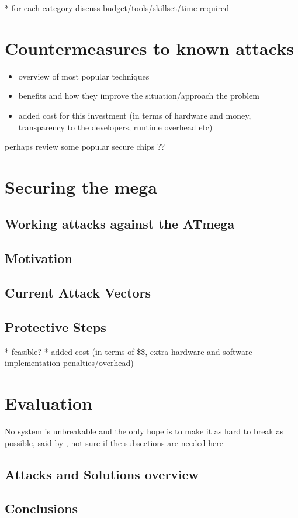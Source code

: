 \documentclass[10pt,a4paper,twocolumn]{article}
\begin{document}
	* for each category discuss budget/tools/skillset/time required\\

\section{Countermeasures to known attacks}
\label{sec:defenses}
	\begin{itemize}
	\item overview of most popular techniques \\
	\item benefits and how they improve the situation/approach the problem
	\item added cost for this investment (in terms of hardware and money, transparency to the developers, runtime overhead etc)\\
	\end{itemize}
	
	perhaps review some popular secure chips ??	
	
	

\section{Securing the mega}
\label{sec:securing_mega}
	\subsection{Working attacks against the ATmega}
	\subsection{Motivation}
	\subsection{Current Attack Vectors}
	\subsection{Protective Steps}
		* feasible? 
		* added cost (in terms of \$\$, extra hardware and software implementation penalties/overhead)
	

\section{Evaluation}
No system is unbreakable and the only hope is to make it as hard to break as possible, said by \citep{tech:aes_bls},\cite{website:scorobogatov_breaking_copy_protection}
\label{sec:conclusion}
	not sure if the subsections are needed here
	\subsection{Attacks and Solutions overview}
	\subsection{Conclusions}
	
	
		
	
\end{document}
